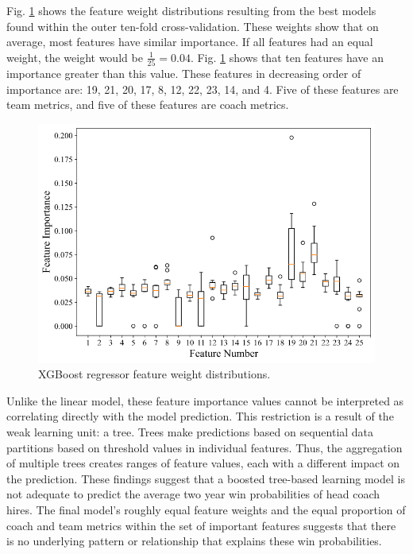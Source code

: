 \documentclass[conference]{IEEEtran}
\begin{document}
Fig. \ref{fig7} shows the feature weight distributions resulting from the best models found within the outer ten-fold cross-validation. These weights show that on average, most features have similar importance. If all features had an equal weight, the weight would be $\frac{1}{25}=0.04$. Fig. \ref{fig7} shows that ten features have an importance greater than this value. These features in decreasing order of importance are: 19, 21, 20, 17, 8, 12, 22, 23, 14, and 4. Five of these features are team metrics, and five of these features are coach metrics. 

\begin{figure}[htbp]
\centerline{\includegraphics[width=1\linewidth]{weight2.png}}
\caption{XGBoost regressor feature weight distributions.}
\label{fig7}
\end{figure}

Unlike the linear model, these feature importance values cannot be interpreted as correlating directly with the model prediction. This restriction is a result of the weak learning unit: a tree. Trees make predictions based on sequential data partitions based on threshold values in individual features. Thus, the aggregation of multiple trees creates ranges of feature values, each with a different impact on the prediction. These findings suggest that a boosted tree-based learning model is not adequate to predict the average two year win probabilities of head coach hires. The final model's roughly equal feature weights and the equal proportion of coach and team metrics within the set of important features suggests that there is no underlying pattern or relationship that explains these win probabilities.
\end{document}
